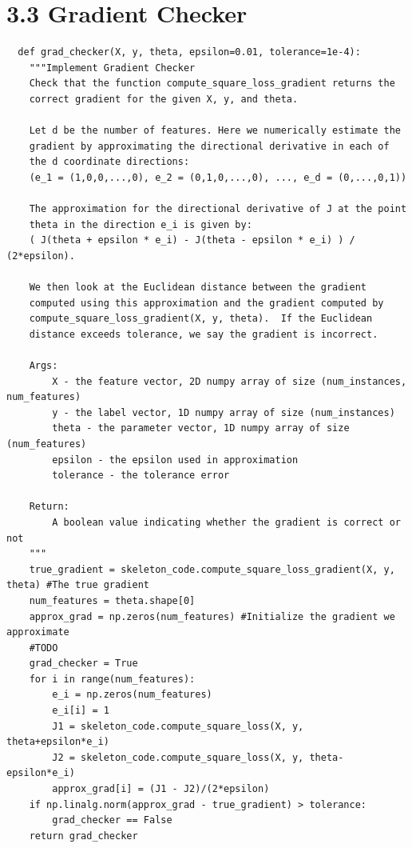 \documentclass{article}
\begin{document}
\section{3.3 Gradient Checker}
\begin{verbatim}
  def grad_checker(X, y, theta, epsilon=0.01, tolerance=1e-4):
    """Implement Gradient Checker
    Check that the function compute_square_loss_gradient returns the
    correct gradient for the given X, y, and theta.

    Let d be the number of features. Here we numerically estimate the
    gradient by approximating the directional derivative in each of
    the d coordinate directions:
    (e_1 = (1,0,0,...,0), e_2 = (0,1,0,...,0), ..., e_d = (0,...,0,1))

    The approximation for the directional derivative of J at the point
    theta in the direction e_i is given by:
    ( J(theta + epsilon * e_i) - J(theta - epsilon * e_i) ) / (2*epsilon).

    We then look at the Euclidean distance between the gradient
    computed using this approximation and the gradient computed by
    compute_square_loss_gradient(X, y, theta).  If the Euclidean
    distance exceeds tolerance, we say the gradient is incorrect.

    Args:
        X - the feature vector, 2D numpy array of size (num_instances, num_features)
        y - the label vector, 1D numpy array of size (num_instances)
        theta - the parameter vector, 1D numpy array of size (num_features)
        epsilon - the epsilon used in approximation
        tolerance - the tolerance error

    Return:
        A boolean value indicating whether the gradient is correct or not
    """
    true_gradient = skeleton_code.compute_square_loss_gradient(X, y, theta) #The true gradient
    num_features = theta.shape[0]
    approx_grad = np.zeros(num_features) #Initialize the gradient we approximate
    #TODO
    grad_checker = True
    for i in range(num_features):
        e_i = np.zeros(num_features)
        e_i[i] = 1
        J1 = skeleton_code.compute_square_loss(X, y, theta+epsilon*e_i)
        J2 = skeleton_code.compute_square_loss(X, y, theta-epsilon*e_i)
        approx_grad[i] = (J1 - J2)/(2*epsilon)
    if np.linalg.norm(approx_grad - true_gradient) > tolerance:
        grad_checker == False
    return grad_checker
\end{verbatim}
\end{document}
